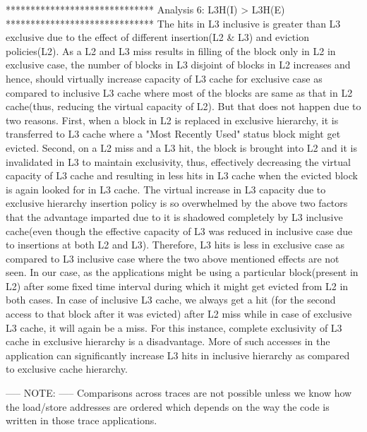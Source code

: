 \documentclass[12pt]{article}
\begin{document}
******************************
Analysis 6: L3H(I) > L3H(E)
******************************
The hits in L3 inclusive is greater than L3 exclusive due to the effect of different insertion(L2 & L3) and eviction policies(L2). As a L2 and L3 miss results in filling of the block only in L2 in exclusive case, the number of blocks in L3 disjoint of blocks in L2 increases and hence, should virtually increase capacity of L3 cache for exclusive case as compared to inclusive L3 cache where most of the blocks are same as that in L2 cache(thus, reducing the virtual capacity of L2). But that does not happen due to two reasons. First, when a block in L2 is replaced in exclusive hierarchy, it is transferred to L3 cache where a "Most Recently Used" status block might get evicted. Second, on a L2 miss and a L3 hit, the block is brought into L2 and it is invalidated in L3 to maintain exclusivity, thus, effectively decreasing the virtual capacity of L3 cache and resulting in less hits in L3 cache when the evicted block is again looked for in L3 cache. The virtual increase in L3 capacity due to exclusive hierarchy insertion policy is so overwhelmed by the above two factors that the advantage imparted due to it is shadowed completely by L3 inclusive cache(even though the effective capacity of L3 was reduced in inclusive case due to insertions at both L2 and L3). Therefore, L3 hits is less in exclusive case as compared to L3 inclusive case where the two above mentioned effects are not seen. In our case, as the applications might be using a particular block(present in L2) after some fixed time interval during which it might get evicted from L2 in both cases. In case of inclusive L3 cache, we always get a hit (for the second access to that block after it was evicted) after L2 miss while in case of exclusive L3 cache, it will again be a miss. For this instance, complete exclusivity of L3 cache in exclusive hierarchy is a disadvantage. More of such accesses in the application can significantly increase L3 hits in inclusive hierarchy as compared to exclusive cache hierarchy.

-----
NOTE:
-----
Comparisons across traces are not possible unless we know how the load/store addresses are ordered which depends on the way the code is written in those trace applications.
\end{document}
